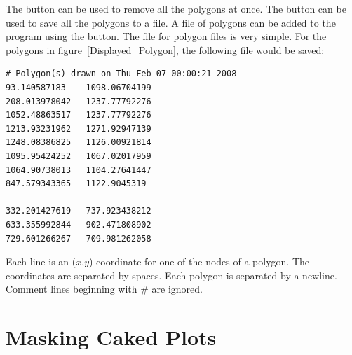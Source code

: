 The  button can be used to remove
all the polygons at once. The  button
can be used to save all the polygons to a file.
A file of polygons can be added to the program 
using the 
 button. The file for polygon
files is very simple. For the polygons in 
figure~\ref{Displayed_Polygon}, the following
file would be saved:
\begin{lstlisting}[caption={'polygons.dat'}]
# Polygon(s) drawn on Thu Feb 07 00:00:21 2008
93.140587183	1098.06704199
208.013978042	1237.77792276
1052.48863517	1237.77792276
1213.93231962	1271.92947139
1248.08386825	1126.00921814
1095.95424252	1067.02017959
1064.90738013	1104.27641447
847.579343365	1122.9045319

332.201427619	737.923438212
633.355992844	902.471808902
729.601266267	709.981262058
\end{lstlisting}
Each line is an ($x$,$y$) coordinate for one of 
the nodes of a polygon.  The coordinates are separated
by spaces. Each polygon is separated by a newline.  
Comment lines beginning with \# are 
ignored. 

\section{Masking Caked Plots}

